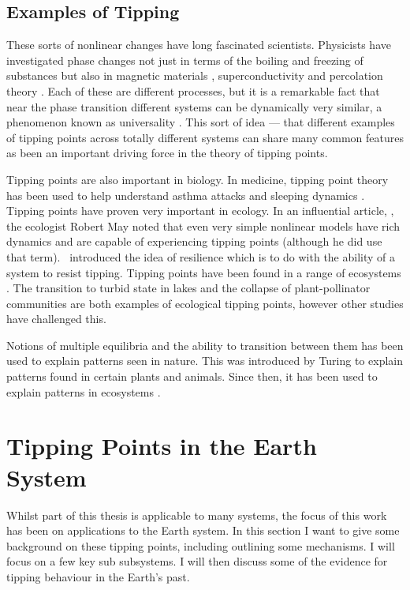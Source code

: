 \subsection{Examples of Tipping}

These sorts of nonlinear changes have long fascinated scientists. Physicists have investigated phase changes not just in terms of the boiling and freezing of substances but also
in magnetic materials \parencite{Ising1925,Onsager1944}, superconductivity \parencite{Landau1965} and percolation theory \parencite{Flory1941}. Each of these are different processes, but it is a
remarkable fact that near the phase transition different systems can be dynamically very similar, a phenomenon known as universality \parencite{Wilson1983}. This sort of idea --- that different examples
of tipping points across totally different systems can share many common features as been an important driving force in the theory of tipping points. 

Tipping points are also important in biology. In medicine, tipping point theory has been used to help understand asthma attacks \parencite{Donovan2022} and sleeping dynamics \parencite{Skeldon2014}.
Tipping points have proven very important in ecology. In an influential article, \parencite{May1976}, the ecologist Robert May noted that even very simple nonlinear models have rich dynamics and are capable
of experiencing tipping points (although he did use that term).~\cite{Holling1973} introduced the idea of resilience which is to do with the ability of a system to resist tipping. Tipping points have
been found in a range of ecosystems \parencite{Scheffer2001,Dakos2019}. The transition to turbid state in lakes \parencite{Scheffer1993} and the collapse of plant-pollinator communities
\parencite{Lever2014} are both examples of ecological tipping points, however other studies \parencite{Hillebrand2020} have challenged this.

Notions of multiple equilibria and the ability to transition between them has been used to explain patterns seen in nature. This was introduced by Turing \parencite{Turing1952} to explain
patterns found in certain plants and animals. Since then, it has been used to explain patterns in ecosystems \parencite{Rietkerk2008}.

\section{Tipping Points in the Earth System}
Whilst part of this thesis is applicable to many systems, the focus of this work has been on applications to the Earth system. In this section I want to give some background on these tipping
points, including outlining some mechanisms. I will focus on a few key sub subsystems. I will then discuss some of the evidence for tipping behaviour in the Earth's past.

